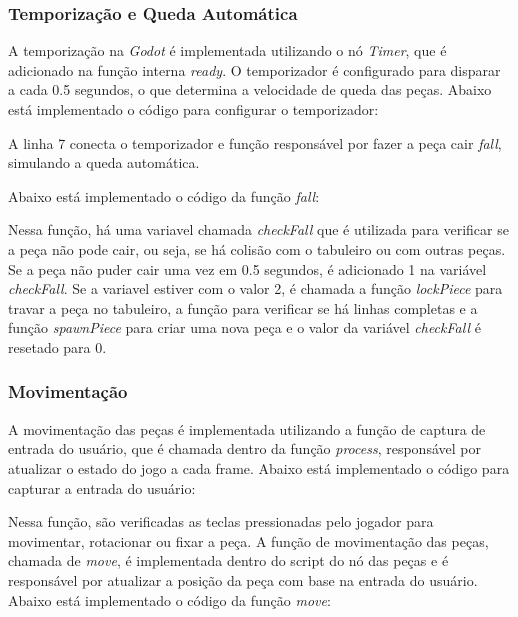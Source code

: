 \subsubsection{Temporização e Queda Automática}

A temporização na \textit{Godot} é implementada utilizando o nó \textit{Timer}, que é adicionado na função interna \textit{ready}. O temporizador é configurado para disparar a cada 0.5 segundos, o que determina a velocidade de queda das peças. Abaixo está implementado o código para configurar o temporizador:



A linha 7 conecta o temporizador e função responsável por fazer a peça cair \textit{fall}, simulando a queda automática.

Abaixo está implementado o código da função \textit{fall}:



Nessa função, há uma variavel chamada \textit{checkFall} que é utilizada para verificar se a peça não pode cair, ou seja, se há colisão com o tabuleiro ou com outras peças. Se a peça não puder cair uma vez em 0.5 segundos, é adicionado 1 na variável \textit{checkFall}. Se a variavel estiver com o valor 2, é chamada a função \textit{lockPiece} para travar a peça no tabuleiro, a função para verificar se há linhas completas e a função \textit{spawnPiece} para criar uma nova peça e o valor da variável \textit{checkFall} é resetado para 0.

\subsubsection{Movimentação}

A movimentação das peças é implementada utilizando a função de captura de entrada do usuário, que é chamada dentro da função \textit{process}, responsável por atualizar o estado do jogo a cada frame. Abaixo está implementado o código para capturar a entrada do usuário:



Nessa função, são verificadas as teclas pressionadas pelo jogador para movimentar, rotacionar ou fixar a peça. A função de movimentação das peças, chamada de \textit{move}, é implementada dentro do script do nó das peças e é responsável por atualizar a posição da peça com base na entrada do usuário. Abaixo está implementado o código da função \textit{move}:


